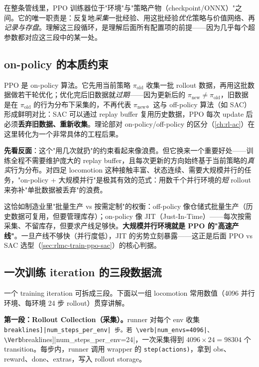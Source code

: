 在整条管线里，PPO 训练器位于"环境"与"策略产物（checkpoint/ONNX）"之间。它的唯一职责是：反复地\emph{采集}一批经验、用这批经验\emph{优化}策略与价值网络、再\emph{记录与存盘}。理解这三段循环，是理解后面所有配置项的前提——因为几乎每个超参数都对应这三段中的某一处。

\subsection{on-policy 的本质约束}

PPO 是 on-policy 算法。它先用当前策略 $\pi_{\text{old}}$ 收集一批 rollout 数据，再用这批数据做若干轮优化；优化完后旧数据就\emph{过期}——因为更新后的 $\pi_{\text{new}}\neq\pi_{\text{old}}$，旧数据是在 $\pi_{\text{old}}$ 的行为分布下采集的，不再代表 $\pi_{\text{new}}$。这与 off-policy 算法（如 SAC）形成鲜明对比：SAC 可以通过 replay buffer 复用历史数据，PPO 每次 update 后必须\textbf{丢弃旧数据、重新收集}。理论部对 on-policy/off-policy 的区分（\cref{ch:rl-ac}）在这里转化为一个非常具体的工程后果。

\textbf{先看反面}：这个"用几次就扔"的约束看起来像浪费。但它换来一个重要好处——训练全程不需要维护庞大的 replay buffer，且每次更新的方向始终基于当前策略的\emph{真实}行为分布。对四足 locomotion 这种接触丰富、状态连续、需要大规模并行的任务，"on-policy + 大规模并行"是极其有效的范式：用数千个并行环境的\emph{短} rollout 来弥补"单批数据被丢弃"的浪费。

\begin{insight}\label{ins:rlmc-onpolicy-jit}
这恰如制造业里"批量生产 vs 按需定制"的权衡：off-policy 像仓储式批量生产（历史数据可复用，但要管理库存）；on-policy 像 JIT（Just-In-Time）——每次按需采集、不留库存，但要求产线足够快。\textbf{大规模并行环境就是 PPO 的"高速产线"}。一旦产线不够快（并行度低），JIT 的劣势立刻暴露——这正是后面 PPO vs SAC 选型（\cref{sec:rlmc-train-ppo-sac}）的核心判据。
\end{insight}

\subsection{一次训练 iteration 的三段数据流}

一个 training iteration 可拆成三段。下面以一组 locomotion 常用数值（4096 并行环境、每环境 24 步 rollout）贯穿讲解。

\textbf{第一段：Rollout Collection（采集）。}runner 对每个 env 收集 \Verb[breaklines]|num_steps_per_env| 步。若 \verb|num_envs=4096|、\Verb[breaklines]|num_steps_per_env=24|，一次采集得到 $4096\times24=98304$ 个 transition。每步内，runner 调用 wrapper 的 \verb|step(actions)|，拿到 obs、reward、done、extras，写入 rollout storage。


